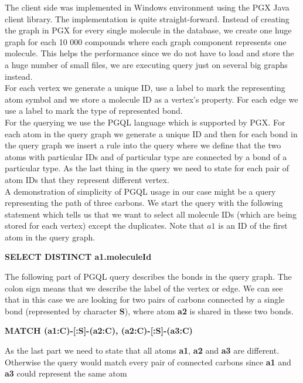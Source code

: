 {The client side was implemented in Windows environment using the PGX Java client library. The implementation is quite straight-forward. Instead of creating the graph in PGX for every single molecule in the database, we create one huge graph for each 10 000 compounds where each graph component represents one molecule. This helps the performance since we do not have to load and store the a huge number of small files, we are executing query just on several big graphs instead.\\

For each vertex we generate a unique ID, use a label to mark the representing atom symbol and we store a molecule ID as a vertex's property. For each edge we use a label to mark the type of represented bond.\\

For the querying we use the PGQL language which is supported by PGX. For each atom in the query graph we generate a unique ID and then for each bond in the query graph we insert a rule into the query where we define that the two atoms with particular IDs and of particular type are connected by a bond of a particular type. As the last thing in the query we need to state for each pair of atom IDs that they represent different vertex.\\

A demonstration of simplicity of PGQL usage in our case might be a query representing the path of three carbons. We start the query with the following statement which tells us that we want to select all molecule IDs (which are being stored for each vertex) except the duplicates. Note that $a1$ is an ID of the first atom in the query graph.

\begin{center}
	\textbf{SELECT DISTINCT a1.moleculeId}
\end{center}

The following part of PGQL query describes the bonds in the query graph. The colon sign means that we describe the label of the vertex or edge. We can see that in this case we are looking for two pairs of carbons connected by a single bond (represented by character \textbf{S}), where atom \textbf{a2} is shared in these two bonds.

\begin{center}
	\textbf{MATCH (a1:C)-[:S]-(a2:C), (a2:C)-[:S]-(a3:C)}
\end{center}

As the last part we need to state that all atoms \textbf{a1}, \textbf{a2} and \textbf{a3} are different. Otherwise the query would match every pair of connected carbons since \textbf{a1} and \textbf{a3} could represent the same atom

}
